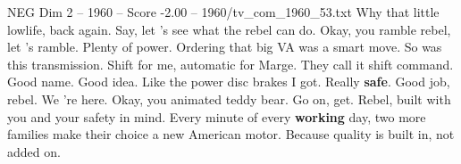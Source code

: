 \begin{textsample}{NEG Dim 2 – 1960 – Score -2.00 – 1960/tv\_com\_1960\_53.txt}  \label{ex:f2_neg_072}
Why that little lowlife, back again.
Say, let 's see what the rebel can do.
Okay, you ramble rebel, let 's ramble.
Plenty of power.
Ordering that big VA was a smart move.
So was this transmission.
Shift for me, automatic for Marge.
They call it shift command.
Good name.
Good idea.
Like the power disc brakes I got.
Really \textbf{safe}.
Good job, rebel.
We 're here.
Okay, you animated teddy bear.
Go on, get.
Rebel, built with you and your safety in mind.
Every minute of every \textbf{working} day, two more families make their choice a new American motor.
Because quality is built in, not added on.

\end{textsample}
